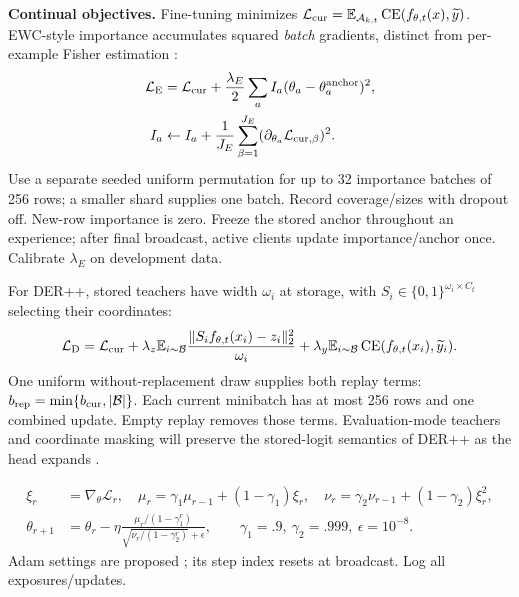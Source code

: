 \documentclass[10pt,a4paper]{article}
\newcommand{\CE}{\operatorname{CE}}
\begin{document}
\textbf{Continual objectives.} Fine-tuning minimizes $\mathcal L_{\rm cur}=\mathbb E_{\mathcal A_{k,t}}\CE(f_{\theta,t}(x),\widetilde y)$. EWC-style importance accumulates squared \emph{batch} gradients, distinct from per-example Fisher estimation \cite{ewc}:
\begin{equation}
\begin{aligned}
\mathcal L_{\rm E}&=\mathcal L_{\rm cur}+\frac{\lambda_E}{2}\sum_aI_a(\theta_a-\theta_a^{\rm anchor})^2,\\
I_a&\leftarrow I_a+\frac1{J_E}\sum_{\beta=1}^{J_E}(\partial_{\theta_a}\mathcal L_{{\rm cur},\beta})^2.
\end{aligned}
\label{eq:ewc}
\end{equation}
Use a separate seeded uniform permutation for up to 32 importance batches of 256 rows; a smaller shard supplies one batch. Record coverage/sizes with dropout off. New-row importance is zero. Freeze the stored anchor throughout an experience; after final broadcast, active clients update importance/anchor once. Calibrate $\lambda_E$ on development data.

For DER++, stored teachers have width $\omega_i$ at storage, with $S_i\in\{0,1\}^{\omega_i\times C_t}$ selecting their coordinates:
\begin{equation}
\mathcal L_{\rm D}=\mathcal L_{\rm cur}
+\lambda_z\mathbb E_{i\sim\mathcal B}\frac{\|S_if_{\theta,t}(x_i)-z_i\|_2^2}{\omega_i}
+\lambda_y\mathbb E_{i\sim\mathcal B}\CE(f_{\theta,t}(x_i),\widetilde y_i).
\label{eq:der}
\end{equation}
One uniform without-replacement draw supplies both replay terms: $b_{\rm rep}=\min\{b_{\rm cur},|\mathcal B|\}$. Each current minibatch has at most 256 rows and one combined update. Empty replay removes those terms. Evaluation-mode teachers and coordinate masking will preserve the stored-logit semantics of DER++ as the head expands \cite{der}.

\begin{equation}
\begin{aligned}
\xi_r&=\nabla_\theta\mathcal L_r,\quad\mu_r=\gamma_1\mu_{r-1}+(1-\gamma_1)\xi_r,\quad
\nu_r=\gamma_2\nu_{r-1}+(1-\gamma_2)\xi_r^2,\\
\theta_{r+1}&=\theta_r-\eta\frac{\mu_r/(1-\gamma_1^r)}{\sqrt{\nu_r/(1-\gamma_2^r)}+\epsilon},\qquad
\gamma_1=.9,\ \gamma_2=.999,\ \epsilon=10^{-8}.
\end{aligned}
\label{eq:adam}
\end{equation}
Adam settings are proposed \cite{adam}; its step index resets at broadcast. Log all exposures/updates.
\end{document}
